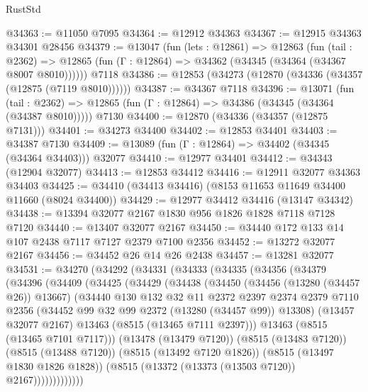 \begin{lexlean}{RustStd}
\begin{coremodule}
@34363 := @11050 @7095
@34364 := @12912 @34363
@34367 := @12915 @34363 @34301 @28456
@34379 := @13047
    (fun (lets : @12861) =>
    @12863
      (fun (tail : @2362) =>
      @12865 (fun (Γ : @12864) => @34362 (@34345 (@34364 (@34367 @8007 @8010))))))
    @7118
@34386 := @12853 (@34273 (@12870 (@34336 (@34357 (@12875 (@7119 @8010))))))
@34387 := @34367 @7118
@34396 := @13071
    (fun (tail : @2362) => @12865 (fun (Γ : @12864) => @34386 (@34345 (@34364 (@34387 @8010)))))
    @7130
@34400 := @12870 (@34336 (@34357 (@12875 @7131)))
@34401 := @34273 @34400
@34402 := @12853 @34401
@34403 := @34387 @7130
@34409 := @13089 (fun (Γ : @12864) => @34402 (@34345 (@34364 @34403))) @32077
@34410 := @12977 @34401
@34412 := @34343 (@12904 @32077)
@34413 := @12853 @34412
@34416 := @12911 @32077 @34363 @34403
@34425 := @34410 (@34413 @34416) (@8153 @11653 @11649 @34400 @11660 (@8024 @34400))
@34429 := @12977 @34412 @34416 (@13147 @34342)
@34438 := @13394 @32077 @2167 @1830 @956 @1826 @1828 @7118 @7128 @7120
@34440 := @13407 @32077 @2167
@34450 := @34440 @172 @133 @14 @107 @2438 @7117 @7127 @2379 @7100 @2356
@34452 := @13272 @32077 @2167
@34456 := @34452 @26 @14 @26 @2438
@34457 := @13281 @32077
@34531 := @34270
    (@34292
      (@34331
        (@34333
          (@34335
            (@34356
              (@34379
                (@34396
                  (@34409
                    (@34425
                      (@34429
                        (@34438
                          (@34450
                            (@34456 (@13280 (@34457 @26)) @13667)
                            (@34440
                              @130
                              @132
                              @32
                              @11
                              @2372
                              @2397
                              @2374
                              @2379
                              @7110
                              @2356
                              (@34452 @99 @32 @99 @2372 (@13280 (@34457 @99)) @13308)
                              (@13457 @32077 @2167)
                              @13463
                              (@8515 (@13465 @7111 @2397)))
                            @13463
                            (@8515 (@13465 @7101 @7117)))
                          (@13478 (@13479 @7120))
                          (@8515 (@13483 @7120))
                          (@8515 (@13488 @7120))
                          (@8515 (@13492 @7120 @1826))
                          (@8515 (@13497 @1830 @1826 @1828))
                          (@8515 (@13372 (@13373 (@13503 @7120)) @2167)))))))))))))

\end{coremodule}
\end{lexlean}
